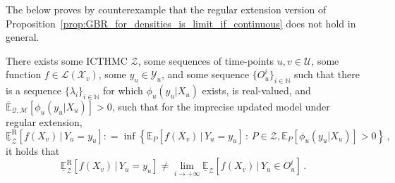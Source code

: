\documentclass[twoside,11pt]{article}
\newcommand{\nats}{\mathbb{N}}
\newcommand{\states}{\mathcal{X}}
\newcommand{\observs}{\mathcal{Y}}
\newcommand{\uexp}{\overline{\mathbb{E}}_{\rateset,\mathcal{M}}}
\newcommand{\gambles}{\mathcal{L}}
\newcommand{\rateset}{\mathcal{Q}}
\newcommand{\coloneqq}{:\!=}
\begin{document}
The below proves by counterexample that the regular extension version of Proposition~\ref{prop:GBR_for_densities_is_limit_if_continuous} does not hold in general.
\begin{proposition}
There exists some ICTHMC $\mathcal{Z}$, some sequences of time-points $u,v\in\mathcal{U}$, some function $f\in\gambles(\states_v)$, some $y_u\in\observs_u$, and some sequence $\{O_u^i\}_{i\in\nats}$ such that there is a sequence $\{\lambda_i\}_{i\in\nats}$ for which $\phi_u(y_u\vert X_u)$ exists, is real-valued, and $\uexp[\phi_u(y_u\vert X_u)]>0$, such that for the imprecise updated model under regular extension,
\begin{equation*}
\underline{\mathbb{E}}_\mathcal{Z}^\mathrm{R}[f(X_v)\,\vert\, Y_u=y_u] \coloneqq \inf\left\{ \mathbb{E}_P[f(X_v)\,\vert\,Y_u=y_u]\,:\,P\in\mathcal{Z}, \mathbb{E}_P[\phi_u(y_u\vert X_u)]>0  \right\}\,,
\end{equation*}
it holds that
\begin{equation*}
\underline{\mathbb{E}}_\mathcal{Z}^\mathrm{R}[f(X_v)\,\vert\, Y_u=y_u] \neq \lim_{i\to+\infty} \underline{\mathbb{E}}_\mathcal{Z}[f(X_v)\,\vert\, Y_u\in O_u^i]\,.
\end{equation*}
\end{proposition}
\end{document}
